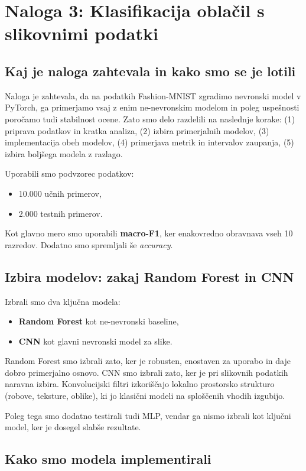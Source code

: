 \documentclass[12pt,a4paper]{article}
\begin{document}
\section*{Naloga 3: Klasifikacija oblačil s slikovnimi podatki}

\subsection*{Kaj je naloga zahtevala in kako smo se je lotili}
Naloga je zahtevala, da na podatkih Fashion-MNIST zgradimo nevronski model v PyTorch, ga primerjamo vsaj z enim ne-nevronskim modelom in poleg uspešnosti poročamo tudi stabilnost ocene. Zato smo delo razdelili na naslednje korake: (1) priprava podatkov in kratka analiza, (2) izbira primerjalnih modelov, (3) implementacija obeh modelov, (4) primerjava metrik in intervalov zaupanja, (5) izbira boljšega modela z razlago.

Uporabili smo podvzorec podatkov:
\begin{itemize}
    \item 10.000 učnih primerov,
    \item 2.000 testnih primerov.
\end{itemize}

Kot glavno mero smo uporabili \textbf{macro-F1}, ker enakovredno obravnava vseh 10 razredov. Dodatno smo spremljali še \emph{accuracy}.

\subsection*{Izbira modelov: zakaj Random Forest in CNN}
Izbrali smo dva ključna modela:
\begin{itemize}
    \item \textbf{Random Forest} kot ne-nevronski baseline,
    \item \textbf{CNN} kot glavni nevronski model za slike.
\end{itemize}

Random Forest smo izbrali zato, ker je robusten, enostaven za uporabo in daje dobro primerjalno osnovo. CNN smo izbrali zato, ker je pri slikovnih podatkih naravna izbira. Konvolucijski filtri izkoriščajo lokalno prostorsko strukturo (robove, teksture, oblike), ki jo klasični modeli na sploščenih vhodih izgubijo.

Poleg tega smo dodatno testirali tudi MLP, vendar ga nismo izbrali kot ključni model, ker je dosegel slabše rezultate.

\subsection*{Kako smo modela implementirali}
\end{document}
